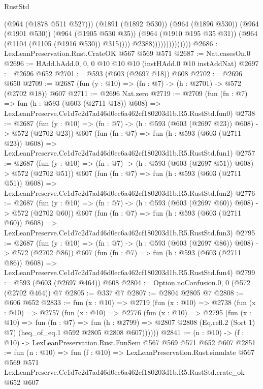 \begin{lexlean}{RustStd}
\begin{coremodule}
                                      (@964 (@1878 @511 @527)))
                                    (@1891 (@1892 @530))
                                    (@964 (@1896 @530))
                                    (@964 (@1901 @530))
                                    (@964 (@1905 @530 @35))
                                    (@964 (@1910 @195 @35 @31))
                                    (@964 (@1104 (@1105 (@1916 @530)) @315))))
                                @2388))))))))))))))
@2686 := LexLeanPreservation.Rust.CrateOK @567 @569 @571
@2687 := Nat.casesOn.{0}
@2696 := HAdd.hAdd.{0, 0, 0} @10 @10 @10 (instHAdd.{0} @10 instAddNat)
@2697 := @2696 @652
@2701 := @593 (@603 (@2697 @18)) @608
@2702 := @2696 @650
@2709 := @2687 (fun (y : @10) => (fn : @7) -> (h : @2701) -> @572 (@2702 @18)) @607
@2711 := @2696 Nat.zero
@2719 := @2709
    (fun (fn : @7) =>
    fun (h : @593 (@603 (@2711 @18)) @608) =>
    LexLeanPreserve.Ce1d7c2d7ad46d0ec6a462cf180203d1b.R5.RustStd.fun0)
@2738 := @2687
    (fun (y : @10) => (fn : @7) -> (h : @593 (@603 (@2697 @23)) @608) -> @572 (@2702 @23))
    @607
    (fun (fn : @7) =>
    fun (h : @593 (@603 (@2711 @23)) @608) =>
    LexLeanPreserve.Ce1d7c2d7ad46d0ec6a462cf180203d1b.R5.RustStd.fun1)
@2757 := @2687
    (fun (y : @10) => (fn : @7) -> (h : @593 (@603 (@2697 @51)) @608) -> @572 (@2702 @51))
    @607
    (fun (fn : @7) =>
    fun (h : @593 (@603 (@2711 @51)) @608) =>
    LexLeanPreserve.Ce1d7c2d7ad46d0ec6a462cf180203d1b.R5.RustStd.fun2)
@2776 := @2687
    (fun (y : @10) => (fn : @7) -> (h : @593 (@603 (@2697 @60)) @608) -> @572 (@2702 @60))
    @607
    (fun (fn : @7) =>
    fun (h : @593 (@603 (@2711 @60)) @608) =>
    LexLeanPreserve.Ce1d7c2d7ad46d0ec6a462cf180203d1b.R5.RustStd.fun3)
@2795 := @2687
    (fun (y : @10) => (fn : @7) -> (h : @593 (@603 (@2697 @86)) @608) -> @572 (@2702 @86))
    @607
    (fun (fn : @7) =>
    fun (h : @593 (@603 (@2711 @86)) @608) =>
    LexLeanPreserve.Ce1d7c2d7ad46d0ec6a462cf180203d1b.R5.RustStd.fun4)
@2799 := @593 (@603 (@2697 @464)) @608
@2804 := Option.noConfusion.{0, 0} (@572 (@2702 @464)) @7
@2805 := @337 @7
@2807 := @2804 @2805 @7
@2808 := @606 @652
@2833 := fun (x : @10) =>
  @2719
    (fun (x : @10) =>
    @2738
      (fun (x : @10) =>
      @2757
        (fun (x : @10) =>
        @2776
          (fun (x : @10) =>
          @2795
            (fun (x : @10) =>
            fun (fn : @7) =>
            fun (h : @2799) =>
            @2807 @2808 (Eq.refl.{2} (Sort 1) @7) (heq_of_eq.{1} @592 @2805 @2808 @607))))))
@2841 := (n : @10) -> (f : @10) -> LexLeanPreservation.Rust.FunSem @567 @569 @571 @652 @607
@2851 := fun (n : @10) =>
  fun (f : @10) =>
  LexLeanPreservation.Rust.simulate
    @567
    @569
    @571
    LexLeanPreserve.Ce1d7c2d7ad46d0ec6a462cf180203d1b.R5.RustStd.crate_ok
    @652
    @607
\end{coremodule}
\end{lexlean}
